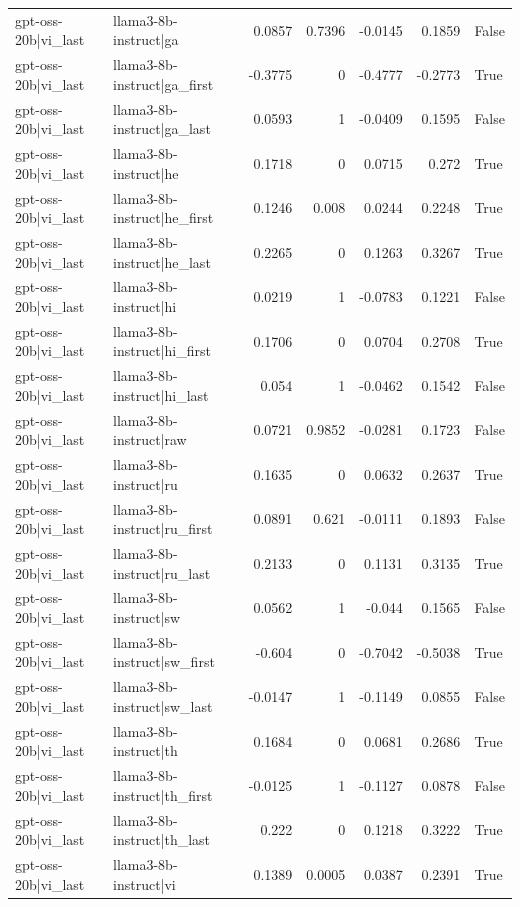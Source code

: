 \begin{table}
\begin{tabular}{l l r r r r l}
gpt-oss-20b|vi_last & llama3-8b-instruct|ga & 0.0857 & 0.7396 & -0.0145 & 0.1859 & False \\
gpt-oss-20b|vi_last & llama3-8b-instruct|ga_first & -0.3775 & 0 & -0.4777 & -0.2773 & True \\
gpt-oss-20b|vi_last & llama3-8b-instruct|ga_last & 0.0593 & 1 & -0.0409 & 0.1595 & False \\
gpt-oss-20b|vi_last & llama3-8b-instruct|he & 0.1718 & 0 & 0.0715 & 0.272 & True \\
gpt-oss-20b|vi_last & llama3-8b-instruct|he_first & 0.1246 & 0.008 & 0.0244 & 0.2248 & True \\
gpt-oss-20b|vi_last & llama3-8b-instruct|he_last & 0.2265 & 0 & 0.1263 & 0.3267 & True \\
gpt-oss-20b|vi_last & llama3-8b-instruct|hi & 0.0219 & 1 & -0.0783 & 0.1221 & False \\
gpt-oss-20b|vi_last & llama3-8b-instruct|hi_first & 0.1706 & 0 & 0.0704 & 0.2708 & True \\
gpt-oss-20b|vi_last & llama3-8b-instruct|hi_last & 0.054 & 1 & -0.0462 & 0.1542 & False \\
gpt-oss-20b|vi_last & llama3-8b-instruct|raw & 0.0721 & 0.9852 & -0.0281 & 0.1723 & False \\
gpt-oss-20b|vi_last & llama3-8b-instruct|ru & 0.1635 & 0 & 0.0632 & 0.2637 & True \\
gpt-oss-20b|vi_last & llama3-8b-instruct|ru_first & 0.0891 & 0.621 & -0.0111 & 0.1893 & False \\
gpt-oss-20b|vi_last & llama3-8b-instruct|ru_last & 0.2133 & 0 & 0.1131 & 0.3135 & True \\
gpt-oss-20b|vi_last & llama3-8b-instruct|sw & 0.0562 & 1 & -0.044 & 0.1565 & False \\
gpt-oss-20b|vi_last & llama3-8b-instruct|sw_first & -0.604 & 0 & -0.7042 & -0.5038 & True \\
gpt-oss-20b|vi_last & llama3-8b-instruct|sw_last & -0.0147 & 1 & -0.1149 & 0.0855 & False \\
gpt-oss-20b|vi_last & llama3-8b-instruct|th & 0.1684 & 0 & 0.0681 & 0.2686 & True \\
gpt-oss-20b|vi_last & llama3-8b-instruct|th_first & -0.0125 & 1 & -0.1127 & 0.0878 & False \\
gpt-oss-20b|vi_last & llama3-8b-instruct|th_last & 0.222 & 0 & 0.1218 & 0.3222 & True \\
gpt-oss-20b|vi_last & llama3-8b-instruct|vi & 0.1389 & 0.0005 & 0.0387 & 0.2391 & True \\

\end{tabular}
\end{table}
